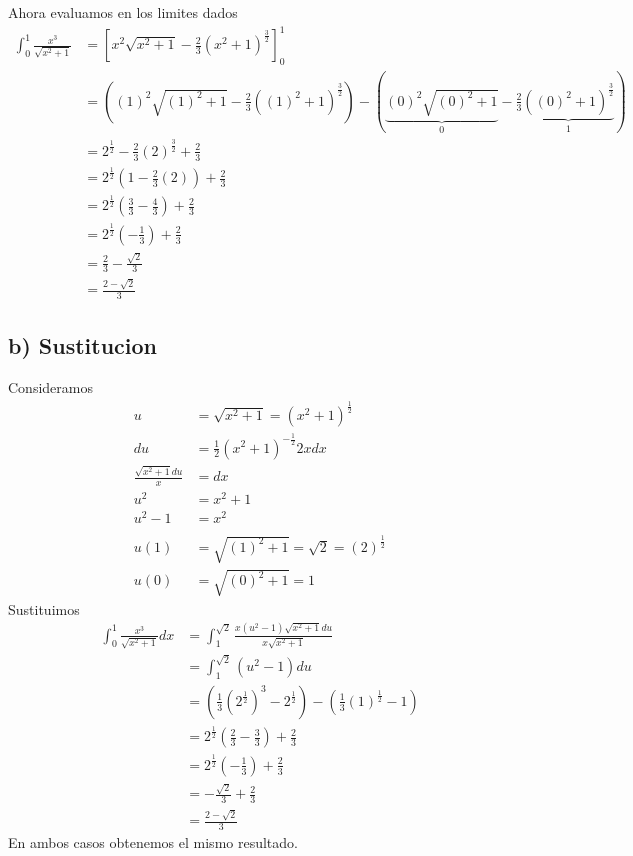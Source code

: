 \documentclass[11pt,letterpaper]{article}
\begin{document}
Ahora evaluamos en los limites dados
\begin{equation*}
  \begin{split}
    \int_{0}^{1}\frac{x^3}{\sqrt{x^2+1}} &= \left[ x^2\sqrt{x^2+1}-\frac{2}{3}(x^2+1)^{\frac{3}{2}}\right]^{1}_{0}\\
    &=\left((1)^2\sqrt{(1)^2+1}-\frac{2}{3}((1)^2+1)^{\frac{3}{2}}\right) - \left(\underbrace{(0)^2\sqrt{(0)^2+1}}_{0}-\frac{2}{3}\underbrace{((0)^2+1)^{\frac{3}{2}}}_{1}\right)\\
    &=2^{\frac{1}{2}}-\frac{2}{3}(2)^{\frac{3}{2}}+\frac{2}{3}\\
    &=2^{\frac{1}{2}}(1-\frac{2}{3}(2))+\frac{2}{3}\\
    &=2^{\frac{1}{2}}(\frac{3}{3}-\frac{4}{3})+\frac{2}{3}\\
    &=2^{\frac{1}{2}}(-\frac{1}{3})+\frac{2}{3}\\
    &=\frac{2}{3}-\frac{\sqrt{2}}{3}\\
    &=\frac{2-\sqrt{2}}{3}
  \end{split}
\end{equation*}

\subsection*{b) Sustitucion}
Consideramos
\begin{equation*}
  \begin{split}
    u &= \sqrt{x^2+1} =(x^2+1)^{\frac{1}{2}}\\
    du &= \frac{1}{2}(x^2+1)^{-\frac{1}{2}}2xdx\\
    \frac{\sqrt{x^2+1}du}{x} &= dx\\
    u^2 &= x^2+1\\
    u^2-1 &= x^2\\
    \\
    u(1) &= \sqrt{(1)^2+1} = \sqrt{2} = (2)^{\frac{1}{2}}\\
    u(0) &= \sqrt{(0)^2+1} = 1
  \end{split}
\end{equation*}
Sustituimos
\begin{equation*}
  \begin{split}
    \int_{0}^{1} \frac{x^3}{\sqrt{x^2+1}}dx &= \int_{1}^{\sqrt{2}} \frac{x(u^2-1)\sqrt{x^2+1}du}{x\sqrt{x^2+1}}\\
    &= \int_{1}^{\sqrt{2}}(u^2-1)du\\
    &= \left( \frac{1}{3}(2^{\frac{1}{2}})^3-2^{\frac{1}{2}} \right) - \left( \frac{1}{3}(1)^{\frac{1}{2}}-1 \right)\\
    &=2^{\frac{1}{2}}\left( \frac{2}{3}-\frac{3}{3} \right)+\frac{2}{3}\\
    &=2^{\frac{1}{2}}\left( -\frac{1}{3}\right) + \frac{2}{3}\\
    &=-\frac{\sqrt{2}}{3}+\frac{2}{3}\\
    &=\frac{2-\sqrt{2}}{3}
  \end{split}
\end{equation*}
En ambos casos obtenemos el mismo resultado.
\end{document}

